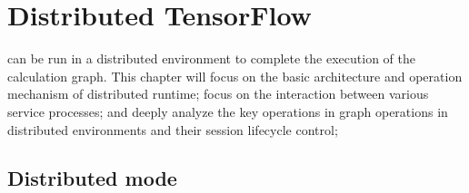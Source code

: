 \begin{savequote}[45mm]
\end{savequote}

\chapter{Distributed TensorFlow} 
\label{ch:distributed}

\begin{content}

\tf{} can be run in a distributed environment to complete the execution of the calculation graph. This chapter will focus on the basic architecture and operation mechanism of distributed runtime; focus on the interaction between various service processes; and deeply analyze the key operations in graph operations in distributed environments and their session lifecycle control;

\end{content}

\section{Distributed mode}

